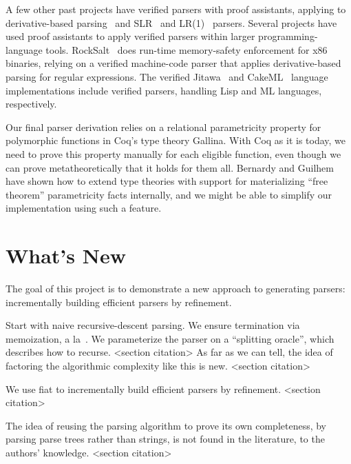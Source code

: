   A few other past projects have verified parsers with proof assistants, applying to derivative-based parsing~\cite{DerivsCoq} and SLR~\cite{SLR} and LR(1)~\cite{LR1} parsers.  Several projects have used proof assistants to apply verified parsers within larger programming-language tools.  RockSalt~\cite{RockSalt} does run-time memory-safety enforcement for x86 binaries, relying on a verified machine-code parser that applies derivative-based parsing for regular expressions.  The verified Jitawa~\cite{Jitawa} and CakeML~\cite{CakeML} language implementations include verified parsers, handling Lisp and ML languages, respectively.

  Our final parser derivation relies on a relational parametricity property for polymorphic functions in Coq's type theory Gallina.  With Coq as it is today, we need to prove this property manually for each eligible function, even though we can prove metatheoretically that it holds for them all.  Bernardy and Guilhem~\cite{InColor} have shown how to extend type theories with support for materializing ``free theorem'' parametricity facts internally, and we might be able to simplify our implementation using such a feature.

\section{What's New} \label{sec:new} \label{sec:goals}
  
  The goal of this project is to demonstrate a new approach to generating parsers: incrementally building efficient parsers by refinement.
  
  Start with naive recursive-descent parsing.  We ensure termination via memoization, a la~\cite{Ridge}.  We parameterize the parser on a ``splitting oracle'', which describes how to recurse. <section citation>  As far as we can tell, the idea of factoring the algorithmic complexity like this is new. <section citation> 
  
  We use fiat to incrementally build efficient parsers by refinement. <section citation>
  
  The idea of reusing the parsing algorithm to prove its own completeness, by parsing parse trees rather than strings, is not found in the literature, to the authors' knowledge. <section citation>
